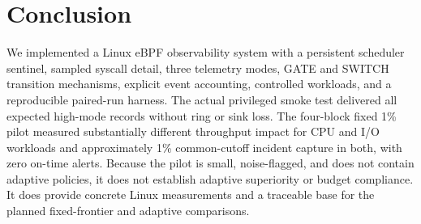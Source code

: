 \documentclass[conference]{IEEEtran}
\begin{document}
\section{Conclusion}
We implemented a Linux eBPF observability system with a persistent scheduler sentinel, sampled syscall detail, three telemetry modes, GATE and SWITCH transition mechanisms, explicit event accounting, controlled workloads, and a reproducible paired-run harness. The actual privileged smoke test delivered all expected high-mode records without ring or sink loss. The four-block fixed 1\% pilot measured substantially different throughput impact for CPU and I/O workloads and approximately 1\% common-cutoff incident capture in both, with zero on-time alerts. Because the pilot is small, noise-flagged, and does not contain adaptive policies, it does not establish adaptive superiority or budget compliance. It does provide concrete Linux measurements and a traceable base for the planned fixed-frontier and adaptive comparisons.

\balance


\end{document}
